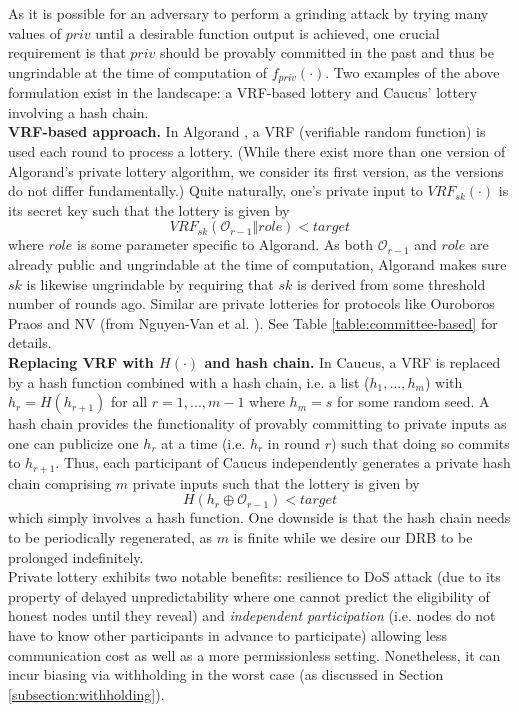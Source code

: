 \documentclass[conference]{IEEEtran}
\theoremstyle{definition}
\theoremstyle{remark}
\begin{document}
As it is possible for an adversary to perform a grinding attack by trying many values of $priv$ until a desirable function output is achieved, one crucial requirement is that $priv$ should be provably committed in the past and thus be ungrindable at the time of computation of $f_{priv}(\cdot)$. Two examples of the above formulation exist in the landscape: a VRF-based lottery and Caucus' \cite{azouvi2018winning} lottery involving a hash chain.\\

\noindent\textbf{VRF-based approach.} In Algorand \cite{gilad2017algorand}, a VRF (verifiable random function) \cite{micali1999verifiable,dodis2005verifiable} is used each round to process a lottery. (While there exist more than one version of Algorand's private lottery algorithm, we consider its first version, as the versions do not differ fundamentally.) Quite naturally, one's private input to $VRF_{sk}(\cdot)$ is its secret key such that the lottery is given by
\[
VRF_{sk}(\mathcal{O}_{r - 1} \mathbin\Vert role) < target
\]
where $role$ is some parameter specific to Algorand. As both $\mathcal{O}_{r - 1}$ and $role$ are already public and ungrindable at the time of computation, Algorand makes sure $sk$ is likewise ungrindable by requiring that $sk$ is derived from some threshold number of rounds ago. Similar are private lotteries for protocols like Ouroboros Praos \cite{david2018ouroboros} and NV (from Nguyen-Van et al. \cite{nguyen2019scalable}). See Table \ref{table:committee-based} for details.\\

\noindent\textbf{Replacing VRF with $H(\cdot)$ and hash chain.} In Caucus, a VRF is replaced by a hash function combined with a hash chain, i.e. a list ($h_1, ..., h_m$) with $h_r = H(h_{r + 1})$ for all $r = 1, ..., m - 1$ where $h_m = s$ for some random seed. A hash chain provides the functionality of provably committing to private inputs as one can publicize one $h_r$ at a time (i.e. $h_r$ in round $r$) such that doing so commits to $h_{r + 1}$. Thus, each participant of Caucus independently generates a private hash chain comprising $m$ private inputs such that the lottery is given by
\[
H(h_r \oplus \mathcal{O}_{r - 1}) < target
\]
which simply involves a hash function. One downside is that the hash chain needs to be periodically regenerated, as $m$ is finite while we desire our DRB to be prolonged indefinitely.\\

Private lottery exhibits two notable benefits: resilience to DoS attack (due to its property of delayed unpredictability \cite{azouvi2018winning} where one cannot predict the eligibility of honest nodes until they reveal) and \textit{independent participation} (i.e. nodes do not have to know other participants in advance to participate) allowing less communication cost as well as a more permissionless setting. Nonetheless, it can incur biasing via withholding in the worst case (as discussed in Section \ref{subsection:withholding}).
\end{document}
